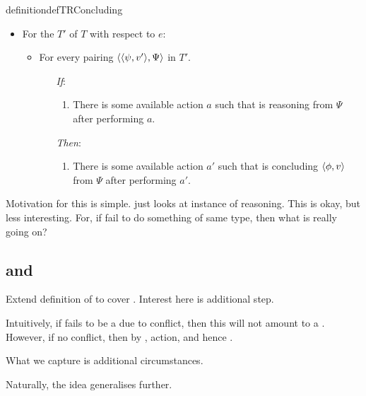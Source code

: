 \begin{note}
\begin{restatable}[\tC{2}]{definition}{defTRConcluding}
    \begin{itemize}[noitemsep]
    \item
      For the  \(T'\) of \(T\) with respect to \(e\):
      \begin{itemize}[noitemsep]
      \item
        For every pairing \(\langle \langle \psi, v' \rangle, \Psi \rangle\) in \(T'\).
        \begin{itemize}[noitemsep]
        \item[\emph{If}:]
          \begin{enumerate}[label=\alph*., ref=(\alph*), series=tRSketch]
          \item
            There is some available action \(a\) such that \vAgent{} is reasoning from \(\Psi\) after performing \(a\).
          \end{enumerate}
        \item[\emph{Then}:]
          \begin{enumerate}[label=\alph*., ref=(\alph*), resume*=tRSketch]
          \item
            There is some available action \(a'\) such that \vAgent{} is concluding \(\langle \phi, v \rangle\) from \(\Psi\) after performing \(a'\).
          \end{enumerate}
        \end{itemize}
      \end{itemize}
    \end{itemize}
    \vspace{-\baselineskip}
  \end{restatable}

  Motivation for this is simple.
  \tR{} just looks at instance of reasoning.
  This is okay, but less interesting.
  For, if fail to do something of same type, then what is really going on?
\end{note}

\subsection{ and }
\label{sec:fc3}

\begin{note}
  Extend definition of \tC{} to cover .
  Interest here is additional step.

  Intuitively, if fails to be a \fc{} due to conflict, then this will not amount to a \tRep{}.
  However, if no conflict, then by \fc{}, action, and hence \tRep{}.

  What we capture is additional circumstances.

  Naturally, the idea generalises further.
\end{note}


